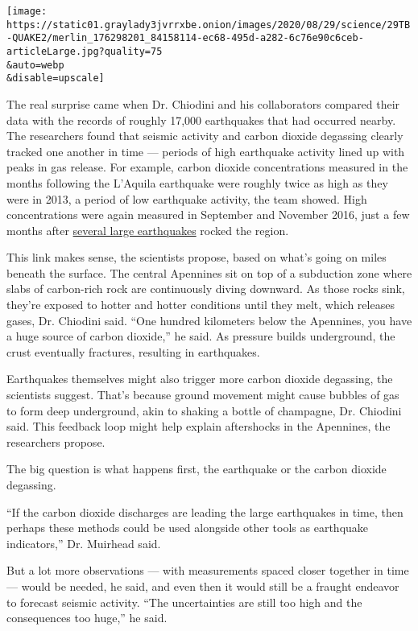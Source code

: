 \texttt{[image: https://static01.graylady3jvrrxbe.onion/images/2020/08/29/science/29TB-QUAKE2/merlin\_176298201\_84158114-ec68-495d-a282-6c76e90c6ceb-articleLarge.jpg?quality=75\\\&auto=webp\\\&disable=upscale]}

The real surprise came when Dr. Chiodini and his collaborators compared
their data with the records of roughly 17,000 earthquakes that had
occurred nearby. The researchers found that seismic activity and carbon
dioxide degassing clearly tracked one another in time --- periods of
high earthquake activity lined up with peaks in gas release. For
example, carbon dioxide concentrations measured in the months following
the L'Aquila earthquake were roughly twice as high as they were in 2013,
a period of low earthquake activity, the team showed. High
concentrations were again measured in September and November 2016, just
a few months after
\href{https://earthquake.usgs.gov/contactus/menlo/seminars/1169}{several
large earthquakes} rocked the region.

This link makes sense, the scientists propose, based on what's going on
miles beneath the surface. The central Apennines sit on top of a
subduction zone where slabs of carbon-rich rock are continuously diving
downward. As those rocks sink, they're exposed to hotter and hotter
conditions until they melt, which releases gases, Dr. Chiodini said.
``One hundred kilometers below the Apennines, you have a huge source of
carbon dioxide,'' he said. As pressure builds underground, the crust
eventually fractures, resulting in earthquakes.

Earthquakes themselves might also trigger more carbon dioxide degassing,
the scientists suggest. That's because ground movement might cause
bubbles of gas to form deep underground, akin to shaking a bottle of
champagne, Dr. Chiodini said. This feedback loop might help explain
aftershocks in the Apennines, the researchers propose.

The big question is what happens first, the earthquake or the carbon
dioxide degassing.

``If the carbon dioxide discharges are leading the large earthquakes in
time, then perhaps these methods could be used alongside other tools as
earthquake indicators,'' Dr. Muirhead said.

But a lot more observations --- with measurements spaced closer together
in time --- would be needed, he said, and even then it would still be a
fraught endeavor to forecast seismic activity. ``The uncertainties are
still too high and the consequences too huge,'' he said.


